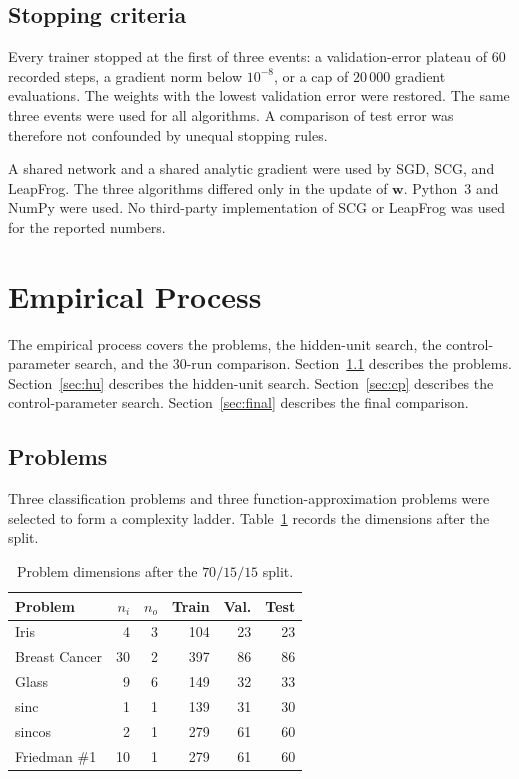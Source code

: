 \documentclass[conference,10pt]{IEEEtran}
\begin{document}
\subsection{Stopping criteria}
\label{sec:stop}
Every trainer stopped at the first of three events: a validation-error plateau of 60 recorded steps, a gradient norm below $10^{-8}$, or a cap of $20\,000$ gradient evaluations.
The weights with the lowest validation error were restored.
The same three events were used for all algorithms.
A comparison of test error was therefore not confounded by unequal stopping rules.

A shared network and a shared analytic gradient were used by SGD, SCG, and LeapFrog.
The three algorithms differed only in the update of $\mathbf{w}$.
Python~3 and NumPy were used.
No third-party implementation of SCG or LeapFrog was used for the reported numbers.

\section{Empirical Process}
\label{sec:empirical}
The empirical process covers the problems, the hidden-unit search, the control-parameter search, and the 30-run comparison.
Section~\ref{sec:problems} describes the problems.
Section~\ref{sec:hu} describes the hidden-unit search.
Section~\ref{sec:cp} describes the control-parameter search.
Section~\ref{sec:final} describes the final comparison.

\subsection{Problems}
\label{sec:problems}
Three classification problems and three function-approximation problems were selected to form a complexity ladder.
Table~\ref{tab:problems} records the dimensions after the split.

\begin{table}[H]
\caption{Problem dimensions after the $70/15/15$ split.}
\label{tab:problems}
\begin{center}
\begin{tabular}{lrrrrr}
\toprule
Problem & $n_{i}$ & $n_{o}$ & Train & Val. & Test \\
\midrule
Iris & 4 & 3 & 104 & 23 & 23 \\
Breast Cancer & 30 & 2 & 397 & 86 & 86 \\
Glass & 9 & 6 & 149 & 32 & 33 \\
sinc & 1 & 1 & 139 & 31 & 30 \\
sincos & 2 & 1 & 279 & 61 & 60 \\
Friedman \#1 & 10 & 1 & 279 & 61 & 60 \\
\bottomrule
\end{tabular}
\end{center}
\end{table}
\end{document}

